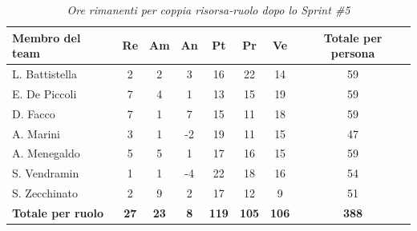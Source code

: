 \documentclass[a4paper, 10pt, colorlinks=true, linkcolor=black, urlcolor=blue, citecolor=blue, hidelinks]{article}
\renewcommand{\arraystretch}{1.2}
\begin{document}
\begin{table}[H]
    \centering
    \renewcommand{\arraystretch}{1.4}
    \begin{tabular}{|l|c|c|c|c|c|c|c|}
        \hline
        \rowcolor{bluBitless!15}
        \textbf{Membro del team} & \textbf{Re} & \textbf{Am} & \textbf{An} & \textbf{Pt} & \textbf{Pr} & \textbf{Ve} & \textbf{Totale per persona} \\
        \hline
        L. Battistella & 2 & 2 & 3 & 16 & 22 & 14 & 59 \\ \hline
        E. De Piccoli & 7 & 4 & 1 & 13 & 15 & 19 & 59 \\ \hline
        D. Facco & 7 & 1 & 7 & 15 & 11 & 18 & 59 \\ \hline
        A. Marini & 3 & 1 & -2 & 19 & 11 & 15 & 47 \\ \hline
        A. Menegaldo & 5 & 5 & 1 & 17 & 16 & 15 & 59 \\ \hline
        S. Vendramin & 1 & 1 & -4 & 22 & 18 & 16 & 54 \\ \hline
        S. Zecchinato & 2 & 9 & 2 & 17 & 12 & 9 & 51 \\ \hline
        \rowcolor{bluBitless!8}
        \textbf{Totale per ruolo} & \textbf{27} & \textbf{23} & \textbf{8} & \textbf{119} & \textbf{105} & \textbf{106} & \textbf{388} \\
        \hline
    \end{tabular}
    \caption{\textit{Ore rimanenti per coppia risorsa-ruolo dopo lo Sprint \#5}}
\end{table}
\end{document}
